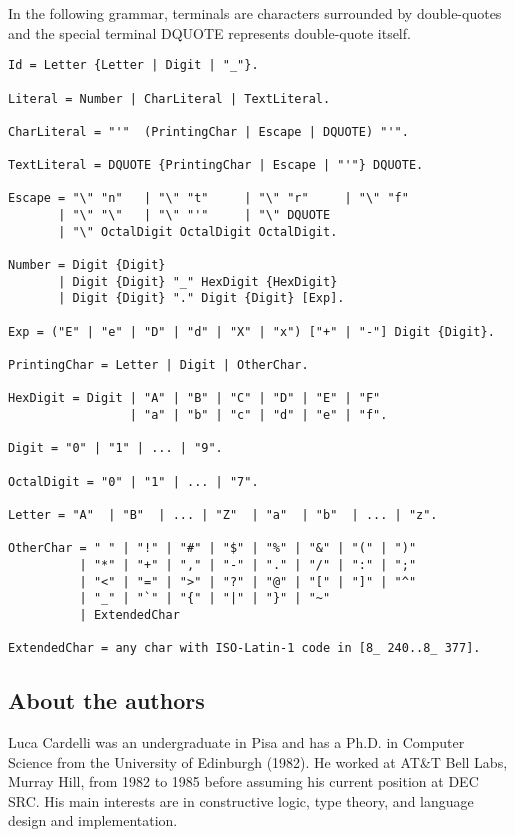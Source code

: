 \documentclass[10pt]{article}
\begin{document}
  In the following grammar, terminals are characters surrounded by double-quotes and the special terminal DQUOTE represents double-quote itself. 


 
\begin{verbatim}
Id = Letter {Letter | Digit | "_"}.

Literal = Number | CharLiteral | TextLiteral.

CharLiteral = "'"  (PrintingChar | Escape | DQUOTE) "'".

TextLiteral = DQUOTE {PrintingChar | Escape | "'"} DQUOTE.

Escape = "\" "n"   | "\" "t"     | "\" "r"     | "\" "f"
       | "\" "\"   | "\" "'"     | "\" DQUOTE
       | "\" OctalDigit OctalDigit OctalDigit.

Number = Digit {Digit}
       | Digit {Digit} "_" HexDigit {HexDigit}
       | Digit {Digit} "." Digit {Digit} [Exp].

Exp = ("E" | "e" | "D" | "d" | "X" | "x") ["+" | "-"] Digit {Digit}.

PrintingChar = Letter | Digit | OtherChar.

HexDigit = Digit | "A" | "B" | "C" | "D" | "E" | "F"
                 | "a" | "b" | "c" | "d" | "e" | "f".

Digit = "0" | "1" | ... | "9".

OctalDigit = "0" | "1" | ... | "7".

Letter = "A"  | "B"  | ... | "Z"  | "a"  | "b"  | ... | "z".

OtherChar = " " | "!" | "#" | "$" | "%" | "&" | "(" | ")"
          | "*" | "+" | "," | "-" | "." | "/" | ":" | ";"
          | "<" | "=" | ">" | "?" | "@" | "[" | "]" | "^"
          | "_" | "`" | "{" | "|" | "}" | "~"
          | ExtendedChar

ExtendedChar = any char with ISO-Latin-1 code in [8_ 240..8_ 377].
\end{verbatim}



 
\subsection*{About the authors}


  Luca Cardelli was an undergraduate in Pisa and has a Ph.D. in Computer Science from the University of Edinburgh (1982). He worked at AT\&T Bell Labs, Murray Hill, from 1982 to 1985 before assuming his current position at DEC SRC. His main interests are in constructive logic, type theory, and language design and implementation. 
\end{document}
